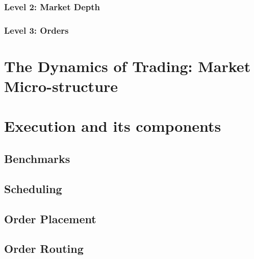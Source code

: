 \subsubsection{Level 2: Market Depth}
\subsubsection{Level 3: Orders}

\section{The Dynamics of Trading: Market Micro-structure}
\section{Execution and its components}
\subsection{Benchmarks}
\subsection{Scheduling}
\subsection{Order Placement}
\subsection{Order Routing}

